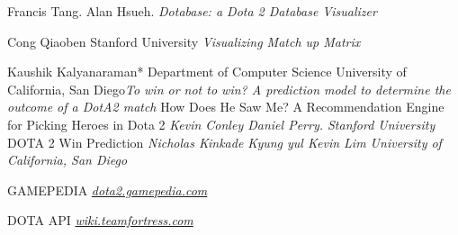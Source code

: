 \documentclass[twocolumn]{autart}    %
\begin{document}
\begin{thebibliography}{15}

Francis Tang. Alan Hsueh.							
\textit{Dotabase: a Dota 2 Database Visualizer}
	
Cong Qiaoben
Stanford University						
\textit{Visualizing Match up Matrix}

Kaushik Kalyanaraman* Department of
Computer Science
University of California, San Diego\textit{To win or not to win? A prediction model to determine the outcome of
a DotA2 match
}
How Does He Saw Me?
A Recommendation Engine for Picking Heroes in
Dota 2
\textit{Kevin Conley 
Daniel Perry.
Stanford University}
DOTA 2 Win Prediction
\textit{Nicholas Kinkade
Kyung yul Kevin Lim
University of California, San Diego
}

GAMEPEDIA 
\textit{\href{http://dota2.gamepedia.com/Dota_2_Wiki}{dota2.gamepedia.com}}
		
DOTA API
\textit{\href{https://wiki.teamfortress.com/wiki/WebAPI}{wiki.teamfortress.com}}


\end{thebibliography}
\end{document}

